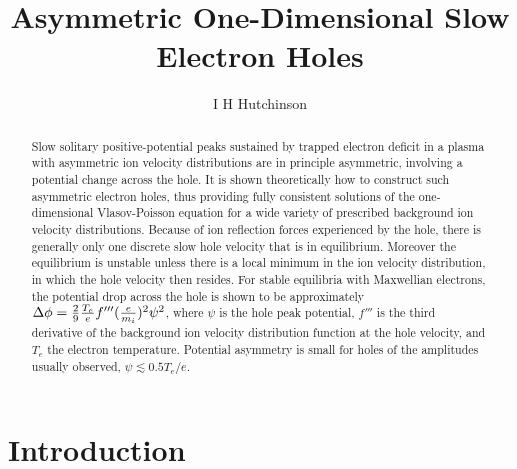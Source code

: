 \documentclass[12pt]{article}
\title{Asymmetric One-Dimensional Slow Electron Holes}
\author{I H Hutchinson}
\begin{document}
\maketitle
\begin{abstract}
  Slow solitary positive-potential peaks sustained by trapped electron
  deficit in a plasma with asymmetric ion velocity distributions are
  in principle asymmetric, involving a potential change across the
  hole.  It is shown theoretically how to construct such asymmetric
  electron holes, thus providing fully consistent solutions of the
  one-dimensional Vlasov-Poisson equation for a wide variety of
  prescribed background ion velocity distributions. Because of ion
  reflection forces experienced by the hole, there is generally only
  one discrete slow hole velocity that is in equilibrium. Moreover the
  equilibrium is unstable unless there is a local minimum in the ion
  velocity distribution, in which the hole velocity then resides. For
  stable equilibria with Maxwellian electrons, the potential drop
  across the hole is shown to be approximately
  $\Delta\phi={2\over 9}{T_e\over e}f'''({e\over m_i})^2\psi^2$, where
  $\psi$ is the hole peak potential, $f'''$ is the third derivative of
  the background ion velocity distribution function at the hole
  velocity, and $T_e$ the electron temperature. Potential asymmetry is
  small for holes of the amplitudes usually observed,
  $\psi\lesssim 0.5T_e/e$.
\end{abstract}

\section{Introduction}
\end{document}
